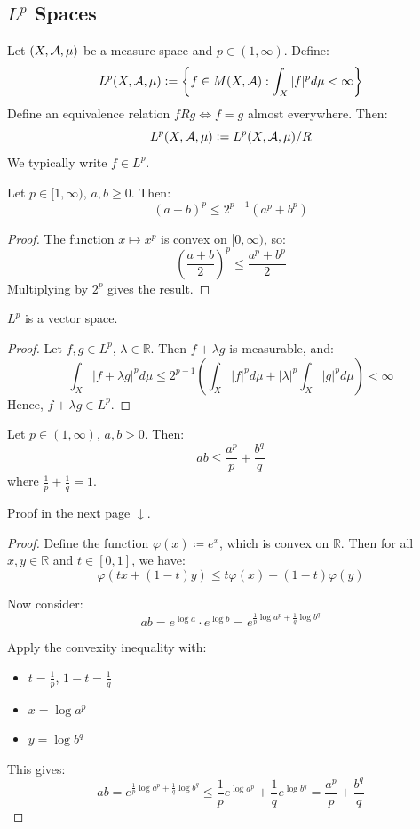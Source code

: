 \subsection{\( L^p \) Spaces}

Let \( (X, \mathcal{A}, \mu) \) be a measure space and \( p \in (1, \infty) \). Define:
\[
L^p(X, \mathcal{A}, \mu) \mathrel{\mathop:}= \left\{ f \in M(X, \mathcal{A}) : \int_X |f|^p  d\mu < \infty \right\}
\]
Define an equivalence relation \( f R g \iff f = g \) almost everywhere. Then:
\[
L^p(X, \mathcal{A}, \mu) \mathrel{\mathop:}= L^p(X, \mathcal{A}, \mu) / R
\]
We typically write \( f \in L^p \).

\begin{lemma}
Let \( p \in [1, \infty) \), \( a, b \geq 0 \). Then:
\[
(a + b)^p \leq 2^{p-1}(a^p + b^p)
\]
\end{lemma}

\begin{proof}
The function \( x \mapsto x^p \) is convex on \( [0, \infty) \), so:
\[
\left( \frac{a + b}{2} \right)^p \leq \frac{a^p + b^p}{2}
\]
Multiplying by \( 2^p \) gives the result.
\end{proof}

\begin{lemma}
\( L^p \) is a vector space.
\end{lemma}

\begin{proof}
Let \( f, g \in L^p \), \( \lambda \in \mathbb{R} \). Then \( f + \lambda g \) is measurable, and:
\[
\int_X |f + \lambda g|^p  d\mu \leq 2^{p-1} \left( \int_X |f|^p  d\mu + |\lambda|^p \int_X |g|^p  d\mu \right) < \infty
\]
Hence, \( f + \lambda g \in L^p \).
\end{proof}

\begin{lemma}
Let \( p \in (1, \infty) \), \( a, b > 0 \). Then:
\[
ab \leq \frac{a^p}{p} + \frac{b^q}{q}
\]
where \( \frac{1}{p} + \frac{1}{q} = 1 \).
\end{lemma}
Proof in the next page $\downarrow$.

\begin{proof}
Define the function \( \varphi(x) \coloneqq e^x \), which is convex on \( \mathbb{R} \). Then for all \( x, y \in \mathbb{R} \) and \( t \in [0,1] \), we have:
\[
\varphi(tx + (1-t)y) \leq t\varphi(x) + (1-t)\varphi(y)
\]

Now consider:
\[
ab = e^{\log a} \cdot e^{\log b} = e^{\frac{1}{p} \log a^p + \frac{1}{q} \log b^q}
\]

Apply the convexity inequality with:
\begin{itemize}
    \item \( t = \frac{1}{p} \), \( 1 - t = \frac{1}{q} \)
    \item \( x = \log a^p \)
    \item \( y = \log b^q \)
\end{itemize}

This gives:
\[
ab=e^{\frac{1}{p} \log a^p + \frac{1}{q} \log b^q} \leq \frac{1}{p} e^{\log a^p} + \frac{1}{q} e^{\log b^q} = \frac{a^p}{p} + \frac{b^q}{q}
\]
\end{proof}

